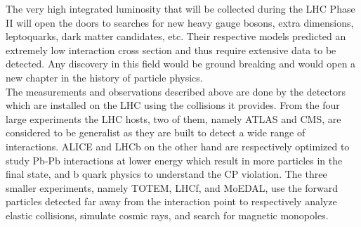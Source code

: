     The very high integrated luminosity that will be collected during the LHC Phase II will open the doors to searches for new heavy gauge bosons, extra dimensions, leptoquarks, dark matter candidates, etc. Their respective models predicted an extremely  low interaction cross section and thus require extensive data to be detected. Any discovery in this field would be ground breaking and would open a new chapter in the history of particle physics. \\

    The measurements and observations described above are done by the detectors which are installed on the LHC using the collisions it provides. From the four large experiments the LHC hosts, two of them, namely ATLAS and CMS, are considered to be generalist as they are built to detect a wide range of interactions. ALICE and LHCb on the other hand are respectively optimized to study Pb-Pb interactions at lower energy which result in more particles in the final state, and b quark physics to understand the CP violation. The three smaller experiments, namely TOTEM, LHCf, and MoEDAL, use the forward particles detected far away from the interaction point to respectively analyze elastic collisions, simulate cosmic rays, and search for magnetic monopoles.
